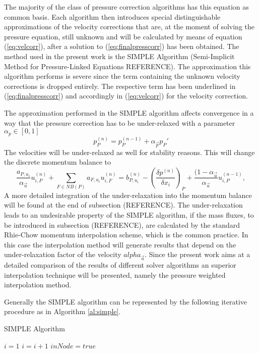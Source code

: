   The majority of the class of pressure correction algorithms has this equation as common basis. Each algorithm then introduces special distinguishable approximations of the velocity corrections that are, at the moment of solving the pressure equation, still unknown and will be calculated by means of equation (\ref{eq:velcorr}), after a solution to (\ref{eq:finalpresscorr}) has been obtained. The method used in the present work is the SIMPLE Algorithm (Semi-Implicit Method for Pressure-Linked Equations REFERENCE). The approximation this algorithm performs is severe since the term containing the unknown velocity corrections is dropped entirely. The respective term has been underlined in (\ref{eq:finalpresscorr}) and accordingly in (\ref{eq:velcorr}) for the velocity correction.
  
  The approximation performed in the SIMPLE algorithm affects convergence in a way that the pressure correction has to be under-relaxed with a parameter \(\alpha_p \in [0,1]\)
  \begin{equation}
    p_P^{(n)} = p_P^{(n-1)} + \alpha_{\vec{p}} p_P'
  \end{equation}
  The velocities will be under-relaxed as well for stability reasons. This will change the discrete momentum balance to
  \begin{displaymath}
    \frac{a_{P,u_i}}{\alpha_{\vec{u}}} u_{i,P}^{(n)} + \sum_{F \in NB(P)} a_{F,u_i} u_{i,F}^{(n)} = b_{P,u_i}^{(n)} - \left(\frac{\delta p^{(n)}}{\delta x_i}\right)_P + \frac{(1 - \alpha_{\vec{u}}}{\alpha_{\vec{u}}} u_{i,P}^{(n-1)} ,
  \end{displaymath}
  A more detailed integration of the under-relaxation into the momentum balance will be found at the end of subsection (REFERENCE). The under-relaxation leads to an undesirable property of the SIMPLE algorithm, if the mass fluxes, to be introduced in subsection (REFERENCE), are calculated by the standard Rhie-Chow momentum interpolation scheme, which is the common practice. In this case the interpolation method will generate results that depend on the under-relaxation factor of the velocity \(alpha_{\vec{u}}\). Since the present work aims at a detailed comparison of the results of different solver algorithms an superior interpolation technique will be presented, namely the pressure weighted interpolation method.

  Generally the SIMPLE algorithm can be represented by the following iterative procedure as in Algorithm \ref{al:simple}.
\begin{algorithm}
\label{al:simple}
\caption{SIMPLE Algorithm}
\begin{algorithmic}
\State $i=1$ \Comment{*}
                 \Comment{*}
        \State $i=i+1$
    \EndWhile
                             \Comment{*}
                                             
            \State $inNode = true$
        \EndIf
    \EndIf
\end{algorithmic}
\end{algorithm}

